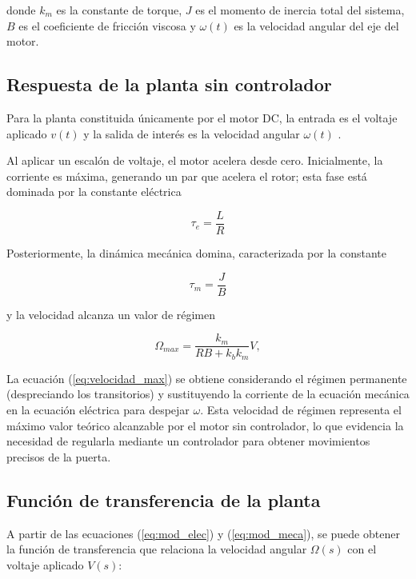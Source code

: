 \documentclass[letter,12pt]{article}
\begin{document}
donde $k_m$ es la constante de torque, $J$ es el momento de inercia total del sistema, $B$ es el coeficiente de fricción viscosa y $\omega(t)$ es la velocidad angular del eje del motor.

\subsection{Respuesta de la planta sin controlador}

Para la planta constituida únicamente por el motor DC, la entrada es el voltaje aplicado $v(t)$ y la salida de interés es la velocidad angular $\omega(t)$ \cite{zaccarian_dc_motors}.

Al aplicar un escalón de voltaje, el motor acelera desde cero. Inicialmente, la corriente es máxima, generando un par que acelera el rotor; esta fase está dominada por la constante eléctrica

\begin{equation}
	\tau_e = \frac{L}{R}
\end{equation}


Posteriormente, la dinámica mecánica domina, caracterizada por la constante

\begin{equation}
	\tau_m = \frac{J}{B}
\end{equation}

y la velocidad alcanza un valor de régimen

\begin{equation}
	\Omega_{max} = \frac{k_m}{R B + k_b k_m} V,
	\label{eq:velocidad_max}
\end{equation}

La ecuación (\ref{eq:velocidad_max}) se obtiene considerando el régimen permanente (despreciando los transitorios) y sustituyendo la corriente de la ecuación mecánica en la ecuación eléctrica para despejar $\omega$. Esta velocidad de régimen representa el máximo valor teórico alcanzable por el motor sin controlador, lo que evidencia la necesidad de regularla mediante un controlador para obtener movimientos precisos de la puerta.

\subsection{Función de transferencia de la planta}

A partir de las ecuaciones (\ref{eq:mod_elec}) y (\ref{eq:mod_meca}), se puede obtener la función de transferencia que relaciona la velocidad angular $\Omega(s)$ con el voltaje aplicado $V(s)$:
\end{document}
